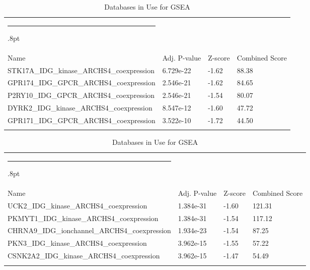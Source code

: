 \documentclass[3p,authoryear,preprint,12pt]{elsarticle}
\makeatletter
\def\hlinewd#1{%
  \noalign{\ifnum0=`}\fi\hrule \@height #1%
  \futurelet\reserved@a\@xhline}
\def\tbltoprule{\hlinewd{.8pt}\\[-12pt]}
\def\tblbottomrule{\noalign{\vspace*{6pt}}\hline\noalign{\vspace*{2pt}}}
\def\tblmidrule{\noalign{\vspace*{6pt}}\hline\noalign{\vspace*{2pt}}}
\makeatother
\begin{document}
\begin{table*}[!htbp]
	\caption{{Databases in Use for GSEA} }
	\label{tw-de478ae31cc6}
	\def\arraystretch{1}
	\ignorespaces 
	\centering 
	\begin{tabulary}{\linewidth}{p{\dimexpr.65\tabcolsep}p{\dimexpr.15\tabcolsep}p{\dimexpr.1\tabcolsep}p{\dimexpr.1\tabcolsep}}
		\tbltoprule Name & Adj. P-value & Z-score & Combined Score\\
		\tblmidrule
STK17A\_IDG\_kinase\_ARCHS4\_coexpression & 6.729e-22 & -1.62 & 88.38 \\
GPR174\_IDG\_GPCR\_ARCHS4\_coexpression & 2.546e-21 & -1.62 & 84.65 \\
P2RY10\_IDG\_GPCR\_ARCHS4\_coexpression & 2.546e-21 & -1.54 & 80.07 \\
DYRK2\_IDG\_kinase\_ARCHS4\_coexpression & 8.547e-12 & -1.60 & 47.72 \\
GPR171\_IDG\_GPCR\_ARCHS4\_coexpression & 3.522e-10 & -1.72 & 44.50 \\
		\tblbottomrule
	\end{tabulary}\par 
\end{table*}
\begin{table*}[!htbp]
	\caption{{Databases in Use for GSEA} }
	\label{tw-de478ae31cc6}
	\def\arraystretch{1}
	\ignorespaces 
	\centering 
	\begin{tabulary}{\linewidth}{p{\dimexpr.65\tabcolsep}p{\dimexpr.15\tabcolsep}p{\dimexpr.1\tabcolsep}p{\dimexpr.1\tabcolsep}}
		\tbltoprule Name & Adj. P-value & Z-score & Combined Score\\
		\tblmidrule
UCK2\_IDG\_kinase\_ARCHS4\_coexpression & 1.384e-31 & -1.60 & 121.31 \\
PKMYT1\_IDG\_kinase\_ARCHS4\_coexpression & 1.384e-31 & -1.54 & 117.12 \\
CHRNA9\_IDG\_ionchannel\_ARCHS4\_coexpression & 1.934e-23 & -1.54 & 87.25 \\
PKN3\_IDG\_kinase\_ARCHS4\_coexpression & 3.962e-15 & -1.55 & 57.22 \\
CSNK2A2\_IDG\_kinase\_ARCHS4\_coexpression & 3.962e-15 & -1.47 & 54.49 \\
		\tblbottomrule
	\end{tabulary}\par 
\end{table*}
\end{document}
